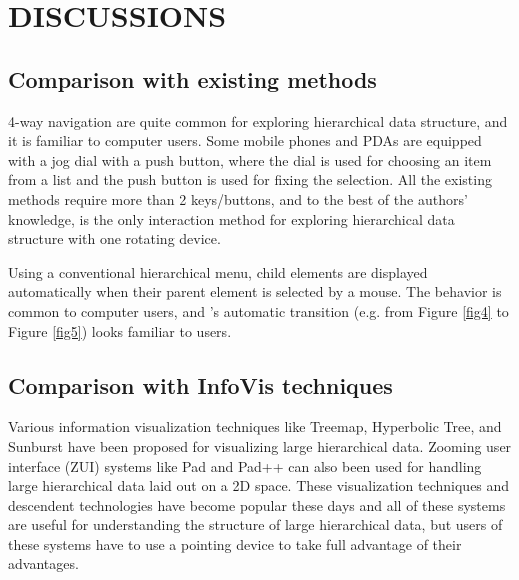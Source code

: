 \documentclass{article}
\begin{document}
\section*{DISCUSSIONS}

\subsection{Comparison with existing methods}

4-way navigation are quite common for exploring hierarchical data structure,
and it is familiar to computer users.
Some mobile phones and PDAs are equipped with a jog dial with a push button,
where the dial is used for choosing an item from a list and 
the push button is used for fixing the selection.
All the existing methods require more than 2 keys/buttons, and
to the best of the authors' knowledge,
{\ST} is the only interaction method for exploring hierarchical data structure
with one rotating device.

Using a conventional hierarchical menu,
child elements are displayed automatically when their parent element is selected by a mouse.
The behavior is common to computer users,
and {\ST}'s automatic transition (e.g. from Figure \ref{fig4} to Figure \ref{fig5})
looks familiar to users.

\subsection{Comparison with InfoVis techniques}

Various information visualization techniques like
Treemap\cite{Johnson:1991:TSA:949607.949654},
Hyperbolic Tree\cite{Lamping:1995:FTB:223904.223956},
and Sunburst\cite{Stasko:2000:FDN:857190.857683}
have been proposed for visualizing large hierarchical data.
Zooming user interface (ZUI) systems like
Pad\cite{Perlin:1993:PAA:166117.166125} and
Pad++\cite{Bederson:1994:PZG:192426.192435}
can also been used for handling large hierarchical data laid out on a 2D space.
%
These visualization techniques and descendent technologies have become popular these days and
all of these systems are useful for understanding the structure of
large hierarchical data, but users of these systems have to use a pointing device
to take full advantage of their advantages.

\end{document}
